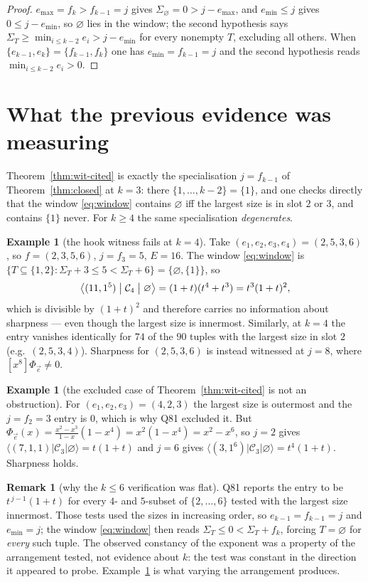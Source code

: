 \documentclass[11pt]{article}
\theoremstyle{definition}
\newtheorem{remark}[theorem]{Remark}
\newtheorem{example}[theorem]{Example}
\newcommand{\Ck}{\mathcal{C}}
\begin{document}
\begin{proof}
$e_{\max}=f_k>f_{k-1}=j$ gives $\Sigma_\varnothing=0>j-e_{\max}$, and $e_{\min}\le j$ gives
$0\le j-e_{\min}$, so $\varnothing$ lies in the window; the second hypothesis says
$\Sigma_T\ge\min_{i\le k-2}e_i>j-e_{\min}$ for every nonempty $T$, excluding all others.
When $\{e_{k-1},e_k\}=\{f_{k-1},f_k\}$ one has $e_{\min}=f_{k-1}=j$ and the second hypothesis
reads $\min_{i\le k-2}e_i>0$.
\end{proof}

\section{What the previous evidence was measuring}

Theorem~\ref{thm:wit-cited} is exactly the specialisation $j=f_{k-1}$ of
Theorem~\ref{thm:closed} at $k=3$: there $\{1,\dots,k-2\}=\{1\}$, and one checks directly that
the window \eqref{eq:window} contains $\varnothing$ iff the largest size is in slot $2$ or $3$,
and contains $\{1\}$ never.  For $k\ge4$ the same specialisation \emph{degenerates}.

\begin{example}[the hook witness fails at $k=4$]\label{ex:fail}
Take $(e_1,e_2,e_3,e_4)=(2,5,3,6)$, so $f=(2,3,5,6)$, $j=f_3=5$, $E=16$.  The window
\eqref{eq:window} is $\{T\subseteq\{1,2\}:\Sigma_T+3\le5<\Sigma_T+6\}=\{\varnothing,\{1\}\}$, so
\[
  \bigl\langle(11,1^5)\bigm|\Ck_4\bigm|\varnothing\bigr\rangle=(1+t)(t^{4}+t^{3})=t^{3}(1+t)^{2},
\]
which is divisible by $(1+t)^2$ and therefore carries no information about sharpness --- even
though the largest size is innermost.  Similarly, at $k=4$ the entry vanishes identically for
$74$ of the $90$ tuples with the largest size in slot $2$ (e.g.\ $(2,5,3,4)$).  Sharpness for
$(2,5,3,6)$ is instead witnessed at $j=8$, where $[x^{8}]\Phi_{\vec e}\neq0$.
\end{example}

\begin{example}[the excluded case of Theorem~\ref{thm:wit-cited} is not an obstruction]
For $(e_1,e_2,e_3)=(4,2,3)$ the largest size is outermost and the $j=f_2=3$ entry is $0$, which
is why Q81 excluded it.  But $\Phi_{\vec e}(x)=\frac{x^2-x^3}{1-x}(1-x^4)=x^2(1-x^4)=x^2-x^6$,
so $j=2$ gives $\langle(7,1,1)|\Ck_3|\varnothing\rangle=t(1+t)$ and $j=6$ gives
$\langle(3,1^6)|\Ck_3|\varnothing\rangle=t^{4}(1+t)$.  Sharpness holds.
\end{example}

\begin{remark}[why the $k\le6$ verification was flat]\label{rem:flat}
Q81 reports the entry to be $t^{\,j-1}(1+t)$ for every $4$- and $5$-subset of $\{2,\dots,6\}$
tested with the largest size innermost.  Those tests used the sizes in increasing order, so
$e_{k-1}=f_{k-1}=j$ and $e_{\min}=j$; the window \eqref{eq:window} then reads
$\Sigma_T\le0<\Sigma_T+f_k$, forcing $T=\varnothing$ for \emph{every} such tuple.  The
observed constancy of the exponent was a property of the arrangement tested, not evidence
about $k$: the test was constant in the direction it appeared to probe.  Example~\ref{ex:fail}
is what varying the arrangement produces.
\end{remark}
\end{document}
